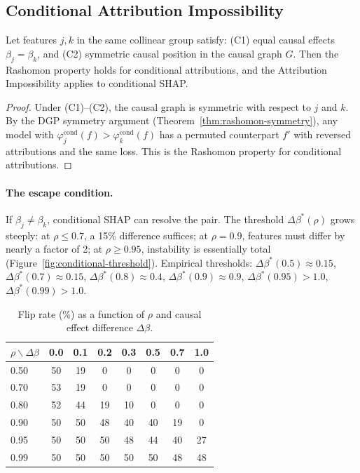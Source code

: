 \documentclass{jmlr}
\begin{document}
\subsection{Conditional Attribution Impossibility}
\label{sec:conditional}

\begin{theorem}
\label{thm:conditional-impossibility}
Let features $j, k$ in the same collinear group satisfy: (C1) equal causal effects $\beta_j = \beta_k$, and (C2) symmetric causal position in the causal graph $G$. Then the Rashomon property holds for conditional attributions, and the Attribution Impossibility applies to conditional SHAP.
\end{theorem}

\begin{proof}
Under (C1)--(C2), the causal graph is symmetric with respect to $j$ and $k$. By the DGP symmetry argument (Theorem~\ref{thm:rashomon-symmetry}), any model with $\varphi_j^{\text{cond}}(f) > \varphi_k^{\text{cond}}(f)$ has a permuted counterpart $f'$ with reversed attributions and the same loss. This is the Rashomon property for conditional attributions.
\end{proof}

\paragraph{The escape condition.}
If $\beta_j \neq \beta_k$, conditional SHAP can resolve the pair. The threshold $\Delta\beta^*(\rho)$ grows steeply: at $\rho \leq 0.7$, a 15\% difference suffices; at $\rho = 0.9$, features must differ by nearly a factor of 2; at $\rho \geq 0.95$, instability is essentially total (Figure~\ref{fig:conditional-threshold}). Empirical thresholds: $\Delta\beta^*(0.5) \approx 0.15$, $\Delta\beta^*(0.7) \approx 0.15$, $\Delta\beta^*(0.8) \approx 0.4$, $\Delta\beta^*(0.9) \approx 0.9$, $\Delta\beta^*(0.95) > 1.0$, $\Delta\beta^*(0.99) > 1.0$.

\begin{table}[t]
\centering
\caption{Flip rate (\%) as a function of $\rho$ and causal effect difference $\Delta\beta$.}
\label{tab:conditional-threshold}
\small
\begin{tabular}{@{}lccccccc@{}}
\toprule
$\rho \backslash \Delta\beta$ & 0.0 & 0.1 & 0.2 & 0.3 & 0.5 & 0.7 & 1.0 \\
\midrule
0.50 & 50 & 19 & 0 & 0 & 0 & 0 & 0 \\
0.70 & 53 & 19 & 0 & 0 & 0 & 0 & 0 \\
0.80 & 52 & 44 & 19 & 10 & 0 & 0 & 0 \\
0.90 & 50 & 50 & 48 & 40 & 40 & 19 & 0 \\
0.95 & 50 & 50 & 50 & 48 & 44 & 40 & 27 \\
0.99 & 50 & 50 & 50 & 50 & 50 & 48 & 48 \\
\bottomrule
\end{tabular}
\end{table}
\end{document}
